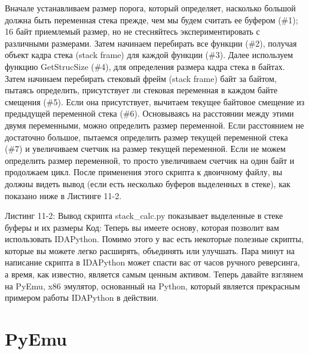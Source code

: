 \documentclass[12pt]{book}
\begin{document}
Вначале устанавливаем размер порога, который определяет, насколько большой должна быть переменная стека прежде, чем мы будем считать ее буфером (\#1); 16 байт приемлемый размер, но не стесняйтесь экспериментировать с различными размерами. Затем начинаем перебирать все функции (\#2), получая объект кадра стека (stack frame) для каждой функции (\#3). Далее используем функцию GetStrucSize (\#4), для определения размера кадра стека в байтах. Затем начинаем перебирать стековый фрейм (stack frame) байт за байтом, пытаясь определить, присутствует ли стековая переменная в каждом байте смещения (\#5). Если она присутствует, вычитаем текущее байтовое смещение из предыдущей переменной стека (\#6). Основываясь на расстоянии между этими двумя переменными, можно определить размер переменной. Если расстоянием не достаточно большое, пытаемся определить размер текущей переменной стека (\#7) и увеличиваем счетчик на размер текущей переменной. Если не можем определить размер переменной, то просто увеличиваем счетчик на один байт и продолжаем цикл. После применения этого скрипта к двоичному файлу, вы должны видеть вывод (если есть несколько буферов выделенных в стеке), как показано ниже в Листинге 11-2.

Листинг 11-2: Вывод скрипта stack\_calc.py показывает выделенные в стеке буферы и их размеры
Код:
Теперь вы имеете основу, которая позволит вам использовать IDAPython. Помимо этого у вас есть некоторые полезные скрипты, которые вы можете легко расширять, объединять или улучшать. Пара минут на написание скрипта в IDAPython может спасти вас от часов ручного реверсинга, а время, как известно, является самым ценным активом. Теперь давайте взглянем на PyEmu, x86 эмулятор, основанный на Python, который является прекрасным примером работы IDAPython в действии.

\chapter{PyEmu}
\end{document}
